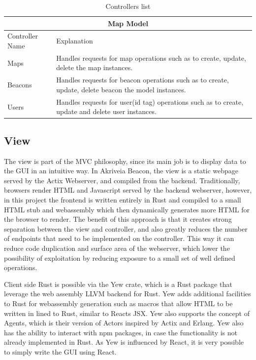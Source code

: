 \medskip
\begin{table}[H]
\centering
\begin{tabular}{| m{3cm} | m{9.5cm} |}
	\hline
	\multicolumn{2}{|c|}{Map Model} \\
	\hline
	Controller Name & Explanation \\
	\hline
	Maps & Handles requests for map operations such as to create, update, delete the map instances. \\
	\hline
	Beacons & Handles requests for beacon operations such as to create, update, delete beacon the model instances. \\
	\hline
	Users & Handles requests for user(id tag) operations such as to create, update and delete user instances. \\
	\hline
\end{tabular}
\caption{Controllers list}
\label{controllers_table}
\end{table}
\medskip

\subsection{View}
\medskip
\label{view_section}
\medskip
The view is part of the MVC philosophy, since its main job is to display data to the GUI in an intuitive way. In Akriveia Beacon, the view is a static webpage served by the Actix Webserver, and compiled from the backend. Traditionally, browsers render HTML and Javascript served by the backend webserver, however, in this project the frontend is written entirely in Rust and compiled to a small HTML stub and webassembly which then dynamically generates more HTML for the browser to render. The benefit of this approach is that it creates strong separation between the view and controller, and also greatly reduces the number of endpoints that need to be implemented on the controller. This way it can reduce code duplication and surface area of the webserver, which lower the possibility of exploitation by reducing exposure to a small set of well defined operations. 

\bigskip
Client side Rust is possible via the Yew crate, which is a Rust package that leverage the web assembly LLVM backend for Rust. Yew adds additional facilities to Rust for webassembly generation such as macros that allow HTML to be written in lined to Rust, similar to Reacts JSX. Yew also supports the concept of Agents, which is their version of Actors inspired by Actix and Erlang. Yew also has the ability to interact with npm packages, in case the functionality is not already implemented in Rust. As Yew is influenced by React, it is very possible to simply write the GUI using React. 

